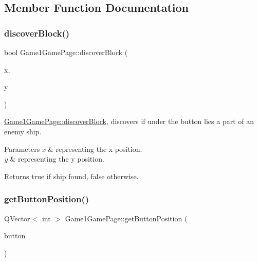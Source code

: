 \subsection{Member Function Documentation}
\mbox{\label{classGame1GamePage_aa70f99c3dafab2856e116f1c37efe4e8}} 
\subsubsection{\texorpdfstring{discover\+Block()}{discoverBlock()}}
{\footnotesize\ttfamily bool Game1\+Game\+Page\+::discover\+Block (\begin{DoxyParamCaption}\item[{int}]{x,  }\item[{int}]{y }\end{DoxyParamCaption})}



\hyperlink{classGame1GamePage_aa70f99c3dafab2856e116f1c37efe4e8}{Game1\+Game\+Page\+::discover\+Block}, discovers if under the button lies a part of an enemy ship. 


\begin{DoxyParams}{Parameters}
{\em x} & representing the x position. \\
\hline
{\em y} & representing the y position. \\
\hline
\end{DoxyParams}
\begin{DoxyReturn}{Returns}
true if ship found, false otherwise. 
\end{DoxyReturn}
\mbox{\label{classGame1GamePage_a47232d81c8e7f96bbf70a16821f86157}} 
\subsubsection{\texorpdfstring{get\+Button\+Position()}{getButtonPosition()}}
{\footnotesize\ttfamily Q\+Vector$<$ int $>$ Game1\+Game\+Page\+::get\+Button\+Position (\begin{DoxyParamCaption}\item[{Q\+Push\+Button $\ast$}]{button }\end{DoxyParamCaption})}



